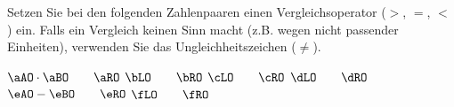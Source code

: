 Setzen Sie bei den folgenden Zahlenpaaren einen Vergleichsoperator ($>$, $=$, $<$) ein. Falls ein Vergleich keinen Sinn macht (z.B. wegen nicht passender Einheiten), verwenden Sie das Ungleichheitszeichen ($\neq$).

\begin{abcliste}
\abc $\aAO\cdot\aBO \qquad \aRO$
\abc $\bLO \qquad \bRO$
\abc $\cLO \qquad \cRO$
\abc $\dLO \qquad \dRO$
\abc $\eAO - \eBO \qquad \eRO$
\abc $\fLO \qquad \fRO$
\end{abcliste}
